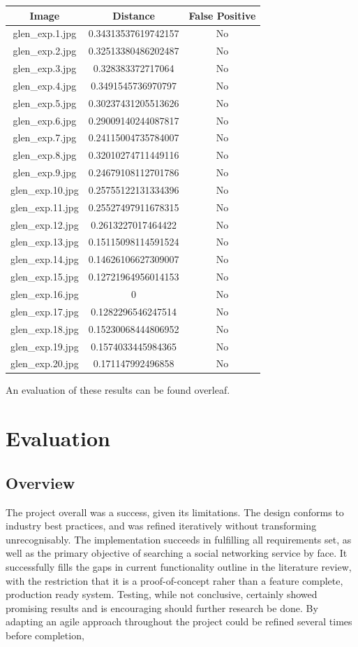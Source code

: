 \documentclass[12pt]{article}
\begin{document}
\begin{center}
\begin{tabular}{ccc}
Image & Distance & False Positive \\
\hline
glen\_exp.1.jpg & 0.34313537619742157 & No \\
glen\_exp.2.jpg & 0.32513380486202487 & No \\
glen\_exp.3.jpg & 0.328383372717064 & No \\
glen\_exp.4.jpg & 0.3491545736970797 & No \\
glen\_exp.5.jpg & 0.30237431205513626 & No \\
glen\_exp.6.jpg & 0.29009140244087817 & No \\
glen\_exp.7.jpg & 0.24115004735784007 & No \\
glen\_exp.8.jpg & 0.32010274711449116 & No \\
glen\_exp.9.jpg & 0.24679108112701786 & No \\
glen\_exp.10.jpg & 0.25755122131334396 & No \\
glen\_exp.11.jpg & 0.25527497911678315 & No \\
glen\_exp.12.jpg & 0.2613227017464422 & No \\
glen\_exp.13.jpg & 0.15115098114591524 & No \\
glen\_exp.14.jpg & 0.14626106627309007 & No \\
glen\_exp.15.jpg & 0.12721964956014153 & No \\
glen\_exp.16.jpg & 0 & No \\
glen\_exp.17.jpg & 0.1282296546247514 & No \\
glen\_exp.18.jpg & 0.15230068444806952 & No \\
glen\_exp.19.jpg & 0.1574033445984365 & No \\
glen\_exp.20.jpg & 0.171147992496858 & No \\
\end{tabular}
\end{center}
\vspace{2cm}

An evaluation of these results can be found overleaf.

\newpage
\section{Evaluation}
\subsection{Overview}
The project overall was a success, given its limitations. The design conforms to industry best practices, and was refined iteratively without transforming unrecognisably. The implementation succeeds in fulfilling all requirements set, as well as the primary objective of searching a social networking service by face. It successfully fills the gaps in current functionality outline in the literature review, with the restriction that it is a proof-of-concept raher than a feature complete, production ready system. Testing, while not conclusive, certainly showed promising results and is encouraging should further research be done. By adapting an agile approach throughout the project could be refined several times before completion, 
\end{document}
